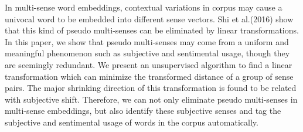 In multi-sense word embeddings, contextual variations in corpus may cause a  univocal word to be embedded into different sense vectors. Shi et al.(2016) show that this kind of pseudo multi-senses can be eliminated by linear transformations. In this paper, we show that pseudo multi-senses may come from a uniform and meaningful phenomenon such as subjective and sentimental usage, though they are seemingly redundant. We present an unsupervised algorithm to find a linear transformation which can minimize the transformed distance of a group of sense pairs. The major shrinking direction of this transformation  is found to be related with subjective shift. Therefore, we can not only eliminate pseudo multi-senses in multi-sense embeddings, but also identify these subjective senses and tag the subjective and sentimental usage of words in the corpus automatically.
